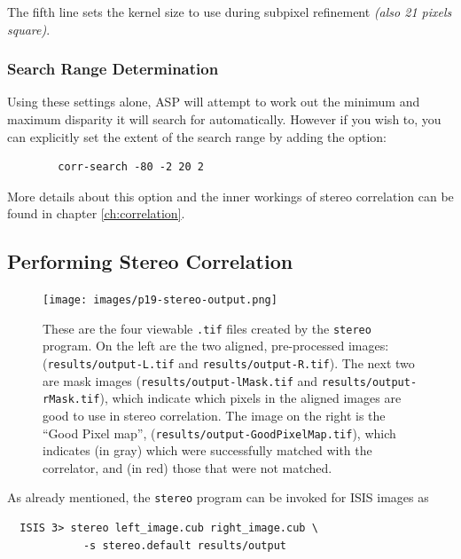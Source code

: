 The fifth line sets the kernel size to use during subpixel refinement
\textit{(also 21 pixels square)}.

\subsubsection*{Search Range Determination}

Using these settings alone, \ac{ASP} will attempt to work out the
minimum and maximum disparity it will search for automatically. However if you
wish to, you can explicitly set the extent of the search range by
adding the option:
\begin{verbatim}
        corr-search -80 -2 20 2
\end{verbatim}

More details about this option and the inner workings of stereo correlation
can be found in chapter \ref{ch:correlation}.

\subsection{Performing Stereo Correlation}\label{perform-stereo}

\begin{figure}[t!]
\begin{minipage}{4in}
\texttt{[image: images/p19-stereo-output.png]}
\end{minipage}
\hfill
\begin{minipage}{2.9in}
\caption[P19 stereo output images]{
    \label{p19-stereo-output}
        These are the four viewable \texttt{.tif} files created by the
        \texttt{stereo} program.  On the left are the two aligned,
        pre-processed images: (\texttt{results/output-L.tif} and
        \texttt{results/output-R.tif}).  The next two are mask images
        (\texttt{results/output-lMask.tif} and
        \texttt{results/output-rMask.tif}), which indicate which
        pixels in the aligned images are good to use in stereo
        correlation.  The image on the right is the ``Good Pixel
        map'', (\texttt{results/output-GoodPixelMap.tif}), which
        indicates (in gray) which were successfully matched with the
        correlator, and (in red) those that were not matched.}
\end{minipage}
\end{figure}

As already mentioned, the \texttt{stereo} program can be invoked for ISIS
images as

\begin{verbatim}
  ISIS 3> stereo left_image.cub right_image.cub \
            -s stereo.default results/output
\end{verbatim}


